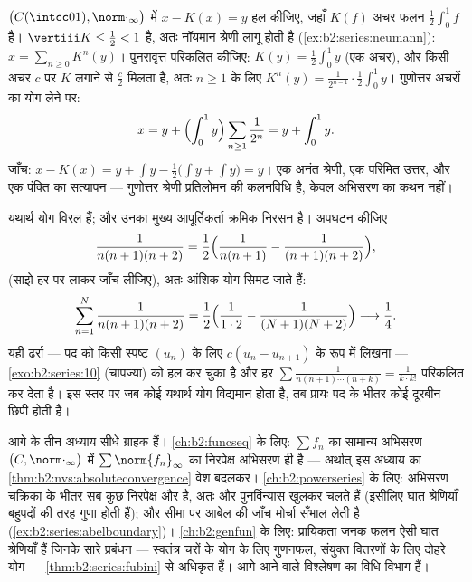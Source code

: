 \begin{example}\label{ex:b2:series:neumannsolve}
 $\bigl(C(\intcc01),
\norm\cdot_\infty\bigr)$ में $x - K(x) = y$ हल कीजिए, जहाँ $K(f)$ अचर फलन $\frac12\int_0^1 f$ है।  $\vertiii K \leq \frac12 < 1$ है, अतः नॉयमान श्रेणी लागू होती है (\cref{ex:b2:series:neumann}): $x = \sum_{n\geq0} K^n(y)$। पुनरावृत्त
परिकलित कीजिए: $K(y) = \frac12\int_0^1 y$ (एक अचर), और किसी अचर $c$ पर $K$ लगाने से $\frac c2$
मिलता है, अतः $n \geq
1$ के लिए $K^n(y) = \frac{1}{2^{n-1}}\cdot\frac12\int_0^1 y$। गुणोत्तर अचरों का योग लेने पर:
\[
x = y + \Bigl(\int_0^1 y\Bigr)
\sum_{n\geq1}\frac{1}{2^n} = y + \int_0^1 y .
\]
जाँच: $x - K(x) = y + \int y - \frac12\bigl(\int y + \int
y\bigr) = y$। एक अनंत श्रेणी, एक परिमित उत्तर, और एक पंक्ति का सत्यापन ---
गुणोत्तर श्रेणी प्रतिलोमन की कलनविधि है, केवल अभिसरण का कथन नहीं।
\end{example}

\begin{example}[आंशिक भिन्नों से क्रमिक निरसन]\label{ex:b2:series:telescope}
यथार्थ योग विरल हैं; और उनका मुख्य आपूर्तिकर्ता क्रमिक निरसन है। अपघटन
कीजिए
\[
\frac{1}{n(n+1)(n+2)}
= \frac{1}{2}\Bigl(\frac{1}{n(n+1)} -
\frac{1}{(n+1)(n+2)}\Bigr),
\]
(साझे हर पर लाकर जाँच लीजिए), अतः आंशिक योग सिमट जाते हैं:
\[
\sum_{n=1}^{N}\frac{1}{n(n+1)(n+2)}
= \frac12\Bigl(\frac{1}{1\cdot2} -
\frac{1}{(N+1)(N+2)}\Bigr)
\longrightarrow \frac14 .
\]
यही ढर्रा --- पद को किसी स्पष्ट $(u_n)$ के लिए $c(u_n - u_{n+1})$ के रूप में लिखना --- \cref{exo:b2:series:10}
(चापज्या) को हल कर चुका है और हर $\sum\frac{1}{n(n+1)\cdots(n +
k)} = \frac{1}{k\cdot k!}$ परिकलित कर देता है। इस स्तर पर जब
कोई यथार्थ योग विद्यमान होता है, तब प्रायः पद के भीतर कोई दूरबीन छिपी
होती है।
\end{example}

\begin{remark}[इसी खंड के भीतर के परिप्रेक्ष्य]\label{rem:b2:series:perspectives}
आगे के तीन अध्याय सीधे ग्राहक हैं। \cref{ch:b2:funcseq} के लिए: $\sum f_n$ का सामान्य अभिसरण
 $\bigl(C, \norm\cdot_\infty\bigr)$ में $\sum\norm{f_n}_\infty$ का निरपेक्ष अभिसरण ही है --- अर्थात् इस अध्याय
का \cref{thm:b2:nvs:absoluteconvergence} वेश बदलकर। \cref{ch:b2:powerseries} के लिए: अभिसरण चक्रिका के भीतर सब कुछ निरपेक्ष और
 है, अतः  और पुनर्विन्यास खुलकर चलते हैं (इसीलिए घात
श्रेणियाँ बहुपदों की तरह गुणा होती हैं); और सीमा पर आबेल की जाँच मोर्चा
सँभाल लेती है (\cref{ex:b2:series:abelboundary})। \cref{ch:b2:genfun} के लिए: प्रायिकता जनक फलन ऐसी घात श्रेणियाँ हैं
जिनके सारे प्रबंधन --- स्वतंत्र चरों के योग के लिए गुणनफल, संयुक्त
वितरणों के लिए दोहरे योग --- \cref{thm:b2:series:fubini} से अधिकृत हैं।  आगे आने वाले
विश्लेषण का विधि-विभाग हैं।
\end{remark}

